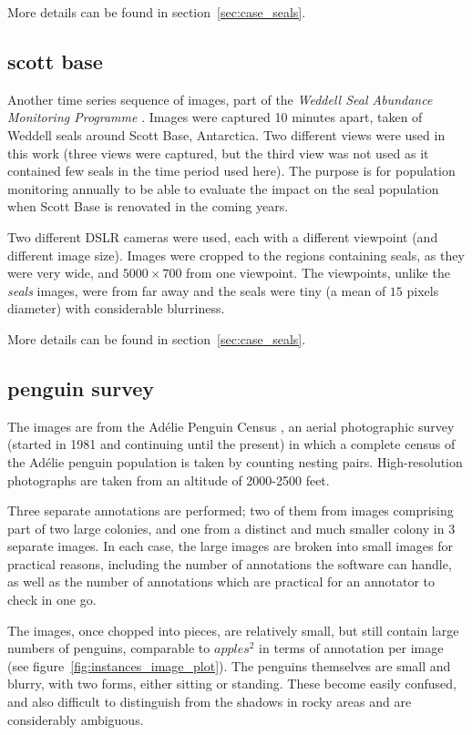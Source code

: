 More details can be found in section~\ref{sec:case_seals}.

\subsection{scott base}
    
Another time series sequence of images, part of the \emph{Weddell Seal Abundance Monitoring Programme} \cite{Eisert2019}. Images were captured 10 minutes apart, taken of Weddell seals around Scott Base, Antarctica. Two different views were used in this work (three views were captured, but the third view was not used as it contained few seals in the time period used here). The purpose is for population monitoring annually to be able to evaluate the impact on the seal population when Scott Base is renovated in the coming years. 

Two different DSLR cameras were used, each with a different viewpoint (and different image size). Images were cropped to the regions containing seals, as they were very wide, and $5000\times700$ from one viewpoint. The viewpoints, unlike the \emph{seals} images, were from far away and the seals were tiny (a mean of $15$ pixels diameter) with considerable blurriness.  
    
More details can be found in section~\ref{sec:case_seals}.
    
\subsection{penguin survey}
    
The images are from the Ad\'elie Penguin Census \cite{Lyver2014}, an aerial photographic survey (started in 1981 and continuing until the present) in which a complete census of the Ad\'elie penguin population is taken by counting nesting pairs. High-resolution photographs are taken from an altitude of 2000-2500 feet.

Three separate annotations are performed; two of them from images comprising part of two large colonies, and one from a distinct and much smaller colony in 3 separate images. In each case, the large images are broken into small images for practical reasons, including the number of annotations the software can handle, as well as the number of annotations which are  practical for an annotator to check in one go.
    
The images, once chopped into pieces, are relatively small, but still contain large numbers of penguins, comparable to $apples^2$ in terms of annotation per image (see figure~\ref{fig:instances_image_plot}). The penguins themselves are small and blurry, with two forms, either sitting or standing. These become  easily confused, and also difficult to distinguish from the shadows in rocky areas and are considerably ambiguous. 

